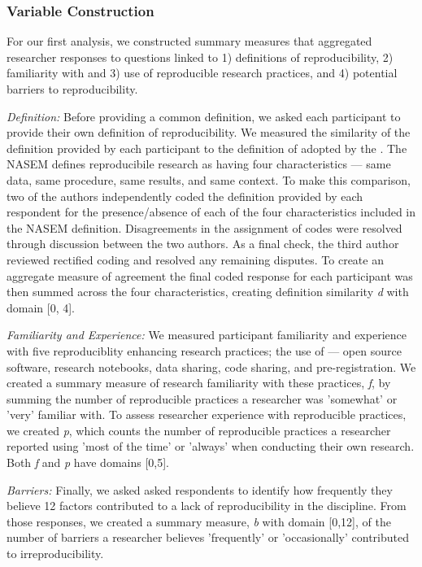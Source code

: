 \documentclass[]{interact}
\theoremstyle{plain}%
\theoremstyle{definition}
\theoremstyle{remark}
\begin{document}
\subsubsection*{Variable Construction}
For our first analysis, we constructed summary measures that aggregated researcher responses to questions linked to 1) definitions of reproducibility, 2) familiarity with and 3) use of reproducible research practices, and 4) potential barriers to reproducibility. 

\textit{Definition:} Before providing a common definition, we asked each participant to provide their own definition of reproducibility.
We measured the similarity of the definition provided by each participant to the definition of adopted by the \citet{NASEM2019}. 
The NASEM defines reproducibile research as having four characteristics --- same data, same procedure, same results, and same context.
To make this comparison, two of the authors independently coded the definition provided by each respondent for the presence/absence of each of the four characteristics included in the NASEM definition.
Disagreements in the assignment of codes were resolved through discussion between the two authors. 
As a final check, the third author reviewed rectified coding and resolved any remaining disputes.
To create an aggregate measure of agreement the final coded response for each participant was then summed across the four characteristics, creating definition similarity \textit{d} with domain [0, 4].

\textit{Familiarity and Experience:} We measured participant familiarity and experience with five reproduciblity enhancing research practices; the use of --- open source software, research notebooks, data sharing, code sharing, and pre-registration. 
We created a summary measure of research familiarity with these practices, \textit{f}, by summing the number of reproducible practices a researcher was 'somewhat' or 'very' familiar with.
To assess researcher experience with reproducible practices, we created \textit{p}, which counts the number of reproducible practices a researcher reported using 'most of the time' or 'always' when conducting their own research. 
Both \textit{f} and \textit{p} have domains [0,5]. 

\textit{Barriers:} Finally, we asked asked respondents to identify how frequently they believe 12 factors contributed to a lack of reproducibility in the discipline. 
From those responses, we created a summary measure, \textit{b} with domain [0,12], of the number of barriers a researcher believes 'frequently' or 'occasionally' contributed to irreproducibility. 
\end{document}
